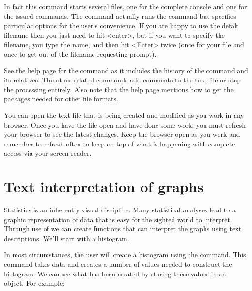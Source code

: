 In fact this command starts several files, one for the complete console and one for the issued commands. The command actually runs the  command but specifies particular options for the user's convenience. If you are happy to use the defalt filename then you just need to hit <enter>, but if you want to specify the filename, you type the name, and then hit <Enter> twice (once for your file and once to get out of the filename requesting prompt). 
 
See the help page for the  command as it includes the history of the command and its relatives. The other related commands add comments to the text file or stop the processing entirely. Also note that the help page mentions how to get the packages needed for other file formats. 
 
 
You can open the text file that is being created and modified as you work in any browser. Once you have the file open and have done some work, you must  refresh your browser to see the latest changes. Keep the browser open as you work and remember to refresh often to keep on top of what is happening with complete access via your screen reader. 
 
\section{Text interpretation of graphs} 
\label{VIExplained}
 
Statistics is an inherently visual discipline. Many statistical analyses lead to a graphic representation of data that is easy for the sighted world to interpret. Through use of \R{} we can create functions that can interpret the graphs using text descriptions. We'll start with a histogram.  
 
In most circumstances, the user will create a histogram using the  command. This command takes data and creates a number of values needed to construct the histogram. We can see what has been created by storing these values in an object. For example: 

\begin{Schunk}
\end{Schunk}

